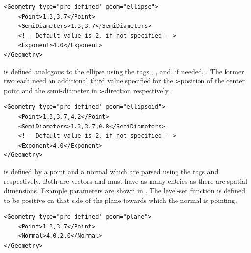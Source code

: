 \begin{minipage}{\linewidth}
\vspace{0.5cm}
\begin{lstlisting}[caption={Example parameters for defining a (super-) ellipse.},captionpos=b, label={lst:ellipse}]
<Geometry type="pre_defined" geom="ellipse"> 
    <Point>1.3,3.7</Point>
    <SemiDiameters>1.3,3.7</SemiDiameters>
    <!-- Default value is 2, if not specified --> 
    <Exponent>4.0</Exponent>
</Geometry>
\end{lstlisting}
\end{minipage}

 is defined analogous to the \hyperlink{ellipse}{ellipse} using the tags , , and, if needed, . The former two each need an additional third value specified for the $z$-position of the center point and the semi-diameter in $z$-direction respectively.

\begin{minipage}{\linewidth}
\vspace{0.5cm}
\begin{lstlisting}[caption={Example parameters for defining a (super-) ellipsoid.},captionpos=b, label={lst:ellipsoid}]
<Geometry type="pre_defined" geom="ellipsoid"> 
    <Point>1.3,3.7,4.2</Point>
    <SemiDiameters>1.3,3.7,0.8</SemiDiameters>
    <!-- Default value is 2, if not specified --> 
    <Exponent>4.0</Exponent>
</Geometry>
\end{lstlisting}
\end{minipage}

 is defined by a point and a normal which are parsed using the tags  and  respectively. Both are vectors and must have as many entries as there are spatial dimensions. Example parameters are shown in . The level-set function is defined to be positive on that side of the plane towards which the normal is pointing.

\begin{minipage}{\linewidth}
\vspace{0.5cm}
\begin{lstlisting}[caption={Example parameters for defining a plane.},captionpos=b, label={lst:plane}]
<Geometry type="pre_defined" geom="plane"> 
    <Point>1.3,3.7</Point>
    <Normal>4.0,2.0</Normal>
</Geometry>
\end{lstlisting}
\end{minipage}


